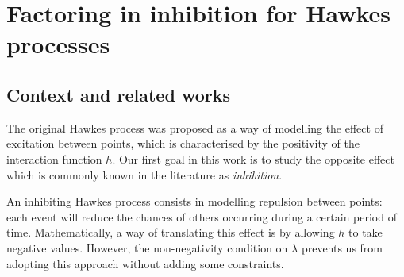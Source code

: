 


\section{Factoring in inhibition for Hawkes processes}\label{sec:chap0_inhibition}
    
    \subsection{Context and related works}
    The original Hawkes process was proposed as a way of modelling the effect of excitation between points, which is characterised by the positivity of the interaction function $h$.
    Our first goal in this work is to study the opposite effect which is commonly known in the literature as \emph{inhibition}.
    
    An inhibiting Hawkes process consists in modelling repulsion between points: each event will reduce the chances of others occurring during a certain period of time.
    Mathematically, a way of translating this effect is by allowing $h$ to take negative values. However, the non-negativity condition on $\lambda$ prevents us from adopting this approach without adding some constraints.

